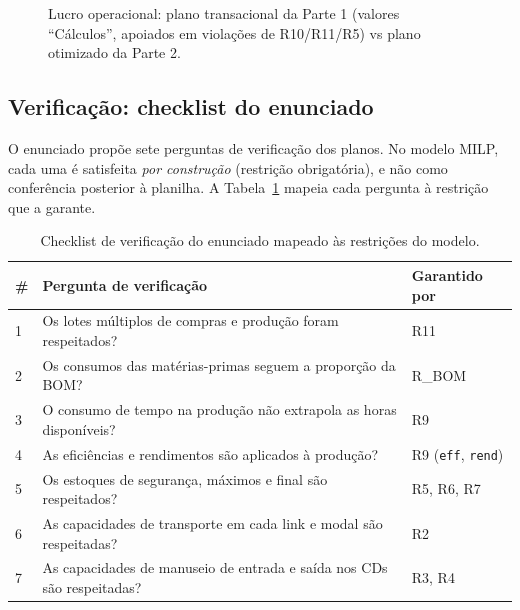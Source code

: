 \documentclass[11pt,a4paper]{article}
\newcommand{\rs}{R\$\,}
\begin{document}
\begin{figure}[H]
\centering
{}
\caption{Lucro operacional: plano transacional da Parte 1 (valores ``Cálculos'', apoiados em violações de R10/R11/R5) vs plano otimizado da Parte 2.}
\label{fig:p1p2}
\end{figure}

\subsection{Verificação: checklist do enunciado}
O enunciado propõe sete perguntas de verificação dos planos. No modelo MILP, cada uma é satisfeita \emph{por construção} (restrição obrigatória), e não como conferência posterior à planilha. A Tabela~\ref{tab:checklist} mapeia cada pergunta à restrição que a garante.

\begin{table}[H]
\centering
\caption{Checklist de verificação do enunciado mapeado às restrições do modelo.}
\label{tab:checklist}
\small
\begin{tabular}{p{0.6cm}p{11.0cm}p{2.7cm}}
\toprule
\textbf{\#} & \textbf{Pergunta de verificação} & \textbf{Garantido por} \\
\midrule
1 & Os lotes múltiplos de compras e produção foram respeitados? & R11 \\
2 & Os consumos das matérias-primas seguem a proporção da BOM? & R\_BOM \\
3 & O consumo de tempo na produção não extrapola as horas disponíveis? & R9 \\
4 & As eficiências e rendimentos são aplicados à produção? & R9 (\texttt{eff}, \texttt{rend}) \\
5 & Os estoques de segurança, máximos e final são respeitados? & R5, R6, R7 \\
6 & As capacidades de transporte em cada link e modal são respeitadas? & R2 \\
7 & As capacidades de manuseio de entrada e saída nos CDs são respeitadas? & R3, R4 \\
\bottomrule
\end{tabular}
\end{table}
\end{document}
